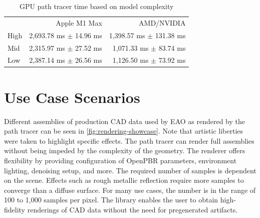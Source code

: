 \begin{table}[H]
    \centering
    \begin{tabular}{lrr}
        \toprule
             & Apple M1 Max               & AMD/NVIDIA                  \\
        High & 2,693.78 ms $\pm$ 14.96 ms & 1,398.57 ms $\pm$ 131.38 ms \\
        Mid  & 2,315.97 ms $\pm$ 27.52 ms & 1,071.33 ms $\pm$ 83.74 ms  \\
        Low  & 2,387.14 ms $\pm$ 26.56 ms & 1,126.50 ms $\pm$ 73.92 ms  \\
        \bottomrule
    \end{tabular}
    \caption{\gls{GPU} path tracer time based on model complexity}
    \label{tab:gpuPerformance}
\end{table}

\newpage
\section{Use Case Scenarios}

Different assemblies of production \gls{CAD} data used by EAO as rendered by the path tracer can be seen in \autoref{fig:rendering-showcase}. Note that artistic liberties were taken to highlight specific effects. The path tracer can render full assemblies without being impeded by the complexity of the geometry. The renderer offers flexibility by providing configuration of \gls{OpenPBR} parameters, environment lighting, denoising setup, and more. The required number of samples is dependent on the scene. Effects such as rough metallic reflection require more samples to converge than a diffuse surface. For many use cases, the number is in the range of 100 to 1,000 samples per pixel. The library enables the user to obtain high-fidelity renderings of \gls{CAD} data without the need for pregenerated artifacts.


